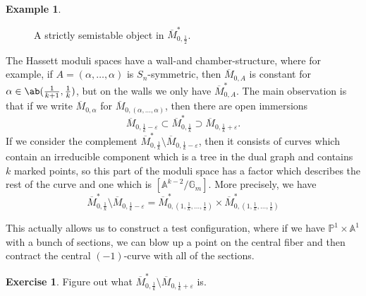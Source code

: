 \documentclass{amsart}
\theoremstyle{definition}
\newtheorem{exm}[thm]{Example}
\newtheorem{exer}[thm]{Exercise}
\theoremstyle{remark}
\theoremstyle{plain}
\theoremstyle{definition}
\theoremstyle{remark}
\newcommand{\A}{\mathbb{A}}
\newcommand{\G}{\mathbb{G}}
\renewcommand{\P}{\mathbb{P}}
\newcommand{\ep}{\varepsilon}
\newcommand{\ol}[1]{\overline{#1}}
\newcommand{\1}{\mathbf{1}}
\newcommand{\2}{\mathbf{2}}
\newcommand{\3}{\mathbf{3}}
\begin{document}
\begin{exm}
\begin{figure}[htpb]
\begin{center}
    \end{center}
    \caption{A strictly semistable object in \(\ol{M}_{0, \frac{1}{2}}^*\). }%
    \label{fig:semistablecurve}
    \end{figure}
\end{exm}

The Hassett moduli spaces have a wall-and chamber-structure, where for example, if \(A = (\alpha, \ldots, \alpha)\) is \(S_n\)-symmetric, then \(\ol{M}_{0,A}\) is constant for \(\alpha \in \ab(\frac{1}{k+1}, \frac{1}{k})\), but on the walls we only have \(\ol{M}_{0, A}^*\). The main observation is that if we write \(\ol{M}_{0, \alpha}\) for \(\ol{M}_{0, (\alpha, \ldots, \alpha)}\), then there are open immersions
\[ \ol{M}_{0, \frac{1}{k}-\ep} \subset \ol{M}_{0, \frac{1}{k}}^* \supset \ol{M}_{0, \frac{1}{k}+\ep}. \]
If we consider the complement \(\ol{M}_{0, \frac{1}{k}}^* \setminus \ol{M}_{0, \frac{1}{k}-\ep}\), then it consists of curves which contain an irreducible component which is a tree in the dual graph and contains \(k\) marked points, so this part of the moduli space has a factor which describes the rest of the curve and one which is \([\A^{k-2}/\G_m]\). More precisely, we have
\[ \ol{M}_{0, \frac{1}{k}}^* \setminus \ol{M}_{0, \frac{1}{k}-\ep} = \ol{M}^*_{0, (1, \frac{1}{k}, \ldots, \frac{1}{k})} \times \ol{M}^*_{0, (1, \frac{1}{k}, \ldots, \frac{1}{k})} \]

This actually allows us to construct a test configuration, where if we have \(\P^1 \times \A^1\) with a bunch of sections, we can blow up a point on the central fiber and then contract the central \((-1)\)-curve with all of the sections.

\begin{exer}
    Figure out what \(\ol{M}_{0, \frac{1}{k}}^* \setminus \ol{M}_{0, \frac{1}{k}+\ep}\) is.
\end{exer}
\end{document}
